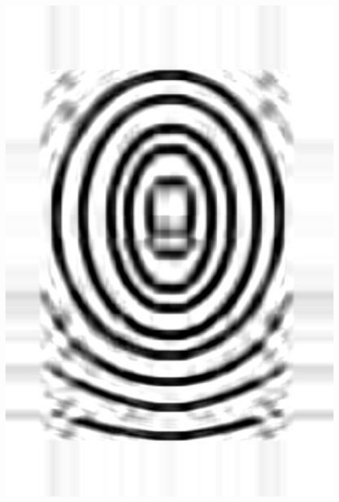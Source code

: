 \documentclass[letter]{amsart}
\begin{document}
\begin{minipage}[H]{0.33\textwidth}
    \centering
    \includegraphics[width=0.95\textwidth]{fingerprintWHORL_svd.jpg}
\end{minipage}
\end{document}
